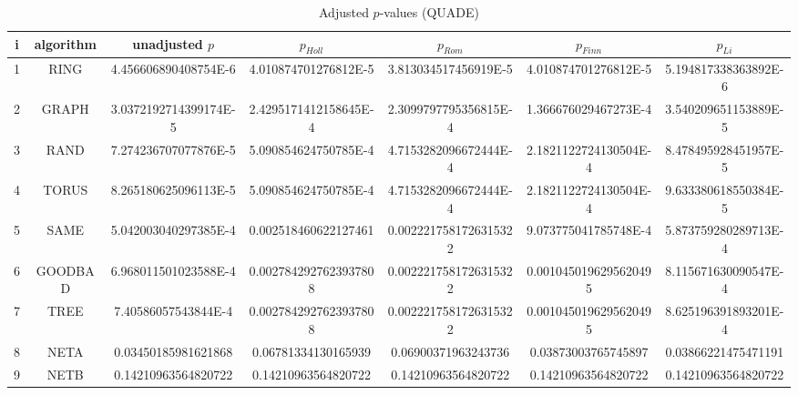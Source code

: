 \documentclass[a4paper,10pt]{article}
\begin{document}
\begin{landscape}
\begin{table}[!htp]
\centering\scriptsize
\caption{Adjusted $p$-values (QUADE)}
\begin{tabular}{ccccccc}
i&algorithm&unadjusted $p$&$p_{Holl}$&$p_{Rom}$&$p_{Finn}$&$p_{Li}$\\
\hline
1& RING&4.456606890408754E-6&4.010874701276812E-5&3.813034517456919E-5&4.010874701276812E-5&5.194817338363892E-6\\
2& GRAPH&3.0372192714399174E-5&2.4295171412158645E-4&2.3099797795356815E-4&1.366676029467273E-4&3.540209651153889E-5\\
3& RAND&7.274236707077876E-5&5.090854624750785E-4&4.7153282096672444E-4&2.1821122724130504E-4&8.478495928451957E-5\\
4& TORUS&8.265180625096113E-5&5.090854624750785E-4&4.7153282096672444E-4&2.1821122724130504E-4&9.633380618550384E-5\\
5& SAME&5.042003040297385E-4&0.002518460622127461&0.0022217581726315322&9.073775041785748E-4&5.873759280289713E-4\\
6& GOODBAD&6.968011501023588E-4&0.0027842927623937808&0.0022217581726315322&0.0010450196295620495&8.115671630090547E-4\\
7& TREE&7.40586057543844E-4&0.0027842927623937808&0.0022217581726315322&0.0010450196295620495&8.625196391893201E-4\\
8& NETA&0.03450185981621868&0.06781334130165939&0.06900371963243736&0.03873003765745897&0.03866221475471191\\
9& NETB&0.14210963564820722&0.14210963564820722&0.14210963564820722&0.14210963564820722&0.14210963564820722\\
\hline
\end{tabular}
\end{table}

\end{landscape}
\end{document}
